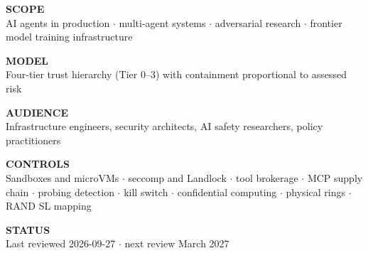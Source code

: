\documentclass[11pt,letterpaper]{article}
\begin{document}
\begin{titlepage}

\vspace*{11.4cm}

{\sffamily\small
\noindent
\begin{minipage}[t]{0.47\textwidth}
\textcolor{cyberteal!70!black}{\footnotesize\bfseries SCOPE}\\[2pt]
AI agents in production $\cdot$ multi-agent systems $\cdot$ adversarial research $\cdot$ frontier model training infrastructure

\vspace{0.7em}
\textcolor{cyberteal!70!black}{\footnotesize\bfseries MODEL}\\[2pt]
Four-tier trust hierarchy (Tier 0--3) with containment proportional to assessed risk

\vspace{0.7em}
\textcolor{cyberteal!70!black}{\footnotesize\bfseries AUDIENCE}\\[2pt]
Infrastructure engineers, security architects, AI safety researchers, policy practitioners
\end{minipage}\hfill
\begin{minipage}[t]{0.47\textwidth}
\textcolor{cyberteal!70!black}{\footnotesize\bfseries CONTROLS}\\[2pt]
Sandboxes and microVMs $\cdot$ seccomp and Landlock $\cdot$ tool brokerage $\cdot$ MCP supply chain $\cdot$ probing detection $\cdot$ kill switch $\cdot$ confidential computing $\cdot$ physical rings $\cdot$ RAND SL mapping

\vspace{0.7em}
\textcolor{cyberteal!70!black}{\footnotesize\bfseries STATUS}\\[2pt]
Last reviewed 2026-09-27 $\cdot$ next review March 2027
\end{minipage}
}

\vspace{1.4em}


\end{titlepage}
\end{document}
